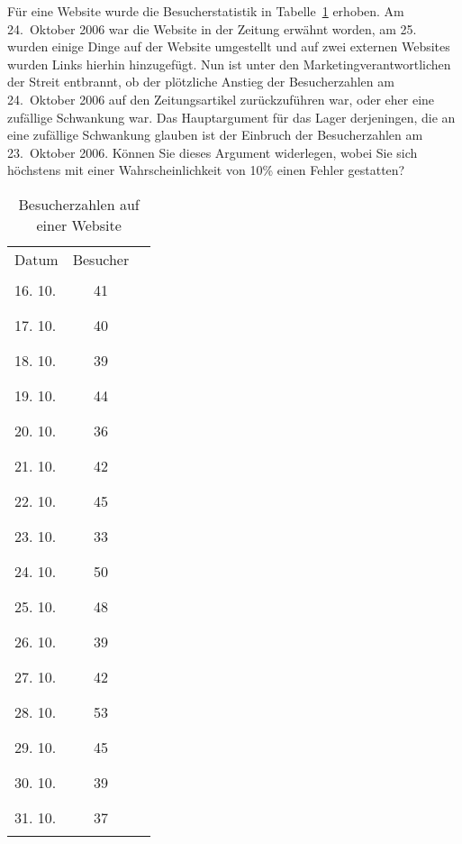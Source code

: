 Für eine Website wurde die Besucherstatistik
in Tabelle~\ref{80000011:besucher}
erhoben. Am 24.~Oktober 2006 war die Website in der Zeitung erwähnt worden,
am 25. wurden einige Dinge auf der Website umgestellt und auf zwei externen
Websites wurden Links hierhin hinzugefügt.
Nun ist unter den Marketingverantwortlichen der Streit entbrannt,
ob der plötzliche Anstieg der Besucherzahlen am 24.~Oktober 2006
auf den Zeitungsartikel zurückzuführen war, oder eher eine zufällige
Schwankung war.
Das Hauptargument für das Lager derjeningen, die an eine zufällige Schwankung
glauben ist der Einbruch der Besucherzahlen am 23.~Oktober 2006.
Können Sie dieses Argument widerlegen, wobei Sie sich
höchstens mit einer Wahrscheinlichkeit von 10\% einen Fehler gestatten?

\begin{table}
\begin{center}
\begin{tabular}{lcl}
Datum&Besucher&\\
16. 10.&41&\rule{41mm}{5pt}\\
17. 10.&40&\rule{40mm}{5pt}\\
18. 10.&39&\rule{39mm}{5pt}\\
19. 10.&44&\rule{44mm}{5pt}\\
20. 10.&36&\rule{36mm}{5pt}\\
21. 10.&42&\rule{42mm}{5pt}\\
22. 10.&45&\rule{45mm}{5pt}\\
23. 10.&33&\rule{33mm}{5pt}\\
24. 10.&50&\rule{50mm}{5pt}\\
25. 10.&48&\rule{48mm}{5pt}\\
26. 10.&39&\rule{39mm}{5pt}\\
27. 10.&42&\rule{42mm}{5pt}\\
28. 10.&53&\rule{53mm}{5pt}\\
29. 10.&45&\rule{45mm}{5pt}\\
30. 10.&39&\rule{39mm}{5pt}\\
31. 10.&37&\rule{37mm}{5pt}\\
\end{tabular}
\end{center}
\caption{Besucherzahlen auf einer Website\label{80000011:besucher}}
\end{table}



